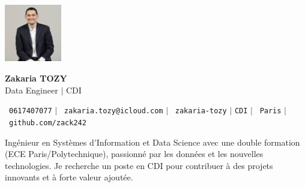\documentclass[11pt,a4paper]{article}
\begin{document}
\begin{center}
  \begin{minipage}[c]{0.2\textwidth}
    \includegraphics[width=2.5cm]{images/profilpicture.png}
  \end{minipage}%
  \begin{minipage}[c]{0.8\textwidth}
    {\LARGE \textbf{Zakaria TOZY}} \\ \vspace{8pt}
    {\small Data Engineer $|$ CDI} \vspace{5pt}
  \end{minipage}
\end{center}

\vspace{10pt}

\begin{center}
    \small \faPhone\ \texttt{0617407077} \hspace{1pt} $|$
    \hspace{1pt} \faEnvelope\ \texttt{zakaria.tozy@icloud.com} \hspace{1pt} $|$
    \hspace{1pt} \faLinkedin\ \texttt{zakaria-tozy} \hspace{1pt} $|$
    \hspace{1pt} \texttt{CDI} \hspace{1pt} $|$
    \hspace{1pt} \faMapMarker\ \texttt{Paris} \hspace{1pt} $|$
    \hspace{1pt} \faGithub\ \texttt{github.com/zack242} \\ \vspace{10pt}
\end{center}

\begin{itemize}[leftmargin=0in, label={}]
\footnotesize{\item{
Ingénieur en Systèmes d'Information et Data Science avec une double formation (ECE Paris/Polytechnique), passionné par les données et les nouvelles technologies. Je recherche un poste en CDI pour contribuer à des projets innovants et à forte valeur ajoutée.
}}
\end{itemize}
\end{document}
